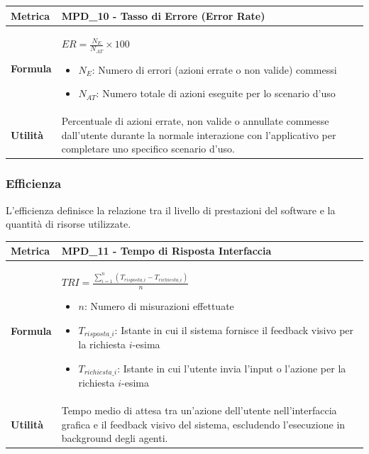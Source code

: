 \documentclass[12pt, a4paper]{article}
\begin{document}
\begin{table}[H]
\centering
\renewcommand{\arraystretch}{1.5}
\begin{tabular}{|l|p{12cm}|}
\hline
\textbf{Metrica} & MPD\_10 - Tasso di Errore (Error Rate) \\ \hline
\textbf{Formula} & $ER = \frac{N_{E}}{N_{AT}} \times 100$
\begin{itemize}
    \item $N_{E}$: Numero di errori (azioni errate o non valide) commessi
    \item $N_{AT}$: Numero totale di azioni eseguite per lo scenario d'uso
\end{itemize} \\ \hline
\textbf{Utilità} & Percentuale di azioni errate, non valide o annullate commesse dall'utente durante la normale interazione con l'applicativo per completare uno specifico scenario d'uso. \\ \hline
\end{tabular}
\end{table}


\subsubsection{Efficienza}
L'efficienza definisce la relazione tra il livello di prestazioni del software e la quantità di risorse utilizzate.

\begin{table}[H]
\centering
\renewcommand{\arraystretch}{1.5}
\begin{tabular}{|l|p{12cm}|}
\hline
\textbf{Metrica} & MPD\_11 - Tempo di Risposta Interfaccia \\ \hline
\textbf{Formula} & $TRI = \frac{\sum_{i=1}^{n} (T_{risposta\_i} - T_{richiesta\_i})}{n}$
\begin{itemize}
    \item $n$: Numero di misurazioni effettuate
    \item $T_{risposta\_i}$: Istante in cui il sistema fornisce il feedback visivo per la richiesta $i$-esima
    \item $T_{richiesta\_i}$: Istante in cui l'utente invia l'input o l'azione per la richiesta $i$-esima
\end{itemize} \\ \hline
\textbf{Utilità} & Tempo medio di attesa tra un'azione dell'utente nell'interfaccia grafica e il feedback visivo del sistema, escludendo l'esecuzione in background degli agenti. \\ \hline
\end{tabular}
\end{table}
\end{document}
